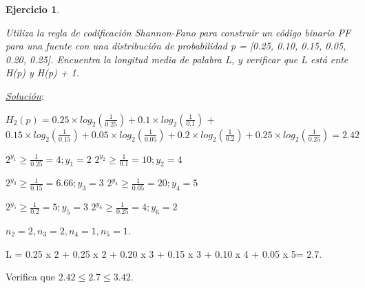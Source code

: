 \documentclass{beamer}
\newtheorem{ejercicio} [Corolario]{Ejercicio}
\begin{document}
\begin{frame}  \small

\begin{ejercicio}\label{ej:SF}

Utiliza la regla de codificación Shannon-Fano para construir un código binario PF para una fuente con una distribución de probabilidad p = [0.25, 0.10, 0.15, 0.05, 0.20, 0.25]. Encuentra la longitud media de palabra L, y verificar que L está ente  H(p) y H(p) + 1.

\end{ejercicio}
\pause

\textit{\underline{Solución}}:\\
\footnotesize

$H_2(p)	=  0.25 \times log_2(\frac{1}{0.25})+ 0.1 \times log_2(\frac{1}{0.1})$ + $0.15 \times log_2(\frac{1}{0.15}) + 0.05 \times log_2(\frac{1}{0.05}) + 0.2 \times log_2(\frac{1}{0.2}) + 0.25 \times log_2(\frac{1}{0.25}) =2.42$\\


\begin{center}
$2^{y_{1}} \geq \frac{1}{0.25} = 4; y_{1} =2$  $2^{y_{2}} \geq \frac{1}{0.1} = 10; y_{2} =4$
\end{center}
\begin{center}
$2^{y_{3}} \geq \frac{1}{0.15} = 6.66; y_{3} =3$  $2^{y_{4}} \geq \frac{1}{0.05} = 20; y_{4} =5$
\end{center}
\begin{center}
$2^{y_{5}} \geq \frac{1}{0.2} = 5; y_{5} =3$ $2^{y_{6}} \geq \frac{1}{0.25} = 4; y_{6} =2$
\end{center}

$n_2 = 2,n_3 = 2,n_4 = 1,n_5 = 1$. \\

\begin{center}
L = 0.25 x 2 + 0.25 x 2 + 0.20 x 3 + 0.15 x 3 + 0.10 x 4 + 0.05 x 5= 2.7.
\end{center}

Verifica que $2.42\leq 2.7 \leq 3.42$.

\end{frame} 
\end{document}
